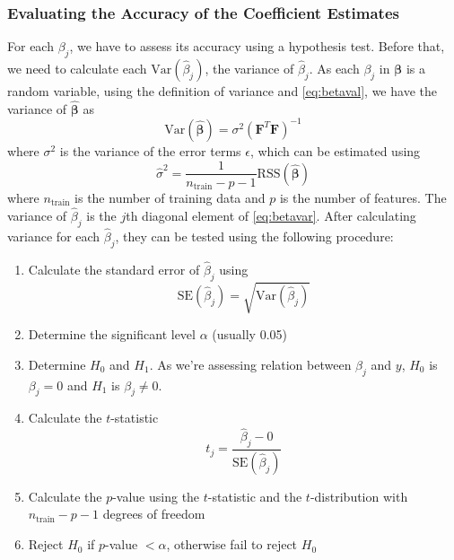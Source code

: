 \documentclass[conf]{new-aiaa}
\begin{document}
\subsubsection{Evaluating the Accuracy of the Coefficient Estimates}
For each $\beta_j$, we have to assess its accuracy using a hypothesis test. Before that, we need to calculate each $\textrm{Var}\left(\hat{\beta}_j\right)$, the variance of $\hat{\beta}_j$. As each $\beta_j$ in $\boldsymbol{\beta}$ is a random variable, using the definition of variance and \eqref{eq:betaval}, we have the variance of $\hat{\boldsymbol{\beta}}$ as
\begin{equation} \label{eq:betavar}
    \textrm{Var}\left(\hat{\boldsymbol{\beta}}\right) = \sigma^2 \left(\mathbf{F}^T\mathbf{F}\right)^{-1}
\end{equation}
where $\sigma^2$ is the variance of the error terms $\epsilon$, which can be estimated using
\begin{equation} \label{eq:sigmasq}
    \hat{\sigma}^2 = \frac{1}{n_{\textrm{train}}-p-1} \textrm{RSS}\left(\hat{\boldsymbol{\beta}}\right)
\end{equation}
where $n_{\textrm{train}}$ is the number of training data and $p$ is the number of features. The variance of $\hat{\beta}_j$ is the $j$th diagonal element of \eqref{eq:betavar}. 
After calculating variance for each $\hat{\beta}_j$, they can be tested using the following procedure:
\begin{enumerate}
    \item Calculate the standard error of $\hat{\beta}_j$ using
    \begin{equation} \label{eq:sebetaj}
        \textrm{SE}\left(\hat{\beta}_j\right) = \sqrt{\textrm{Var}\left(\hat{\beta}_j\right)}
    \end{equation}
    \item Determine the significant level $\alpha$ (usually 0.05)
    \item Determine $H_0$ and $H_1$. As we're assessing relation between $\beta_j$ and $y$, $H_0$ is $\beta_j = 0$ and $H_1$ is $\beta_j \neq 0$.
    \item Calculate the $t$-statistic
    \begin{equation} \label{eq:tstat}
        t_j = \frac{\hat{\beta}_j - 0}{\textrm{SE}\left(\hat{\beta}_j\right)}
    \end{equation}
    \item Calculate the $p$-value using the $t$-statistic and the $t$-distribution with $n_\textrm{train}-p-1$ degrees of freedom
    \item Reject $H_0$ if $p$-value $< \alpha$, otherwise fail to reject $H_0$
\end{enumerate}
\end{document}
